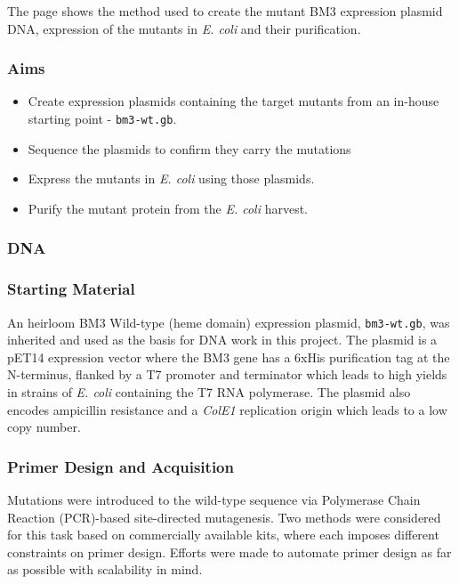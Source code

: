 \documentclass[16pt]{book}
\begin{document}
The page shows the method used to create the mutant BM3 expression plasmid DNA, 
expression of the mutants in \textit{E. coli} and their purification.

\subsubsection{Aims}

\begin{itemize}
	\item Create expression plasmids containing the target mutants from an in-house starting point - \texttt{bm3-wt.gb}.
	\item Sequence the plasmids to confirm they carry the mutations
	\item Express the mutants in \textit{E. coli} using those plasmids.
	\item Purify the mutant protein from the \textit{E. coli} harvest.
\end{itemize}


\subsubsection{DNA}

\subsubsection{Starting Material}

An heirloom BM3 Wild-type (heme domain) expression plasmid, \texttt{bm3-wt.gb}, 
was inherited and used as the basis for DNA work in this project.
The plasmid is a pET14 expression vector where the BM3 gene has a 6xHis purification tag at the N-terminus,
flanked by a T7 promoter and terminator which leads to high yields in strains of \textit{E. coli} containing the T7 RNA polymerase.
The plasmid also encodes ampicillin resistance and a \textit{ColE1} replication origin which leads to a low copy number.


\subsubsection{Primer Design and Acquisition}

Mutations were introduced to the wild-type sequence via Polymerase Chain Reaction (PCR)-based site-directed mutagenesis.
Two methods were considered for this task based on commercially available kits, where each imposes different constraints on primer design.
Efforts were made to automate primer design as far as possible with scalability in mind.
\end{document}
